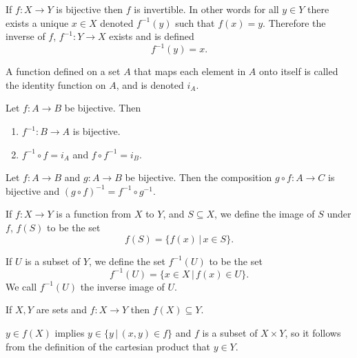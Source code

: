 \documentclass{article}
\begin{document}
\begin{lemma}
	If \(f:X\rightarrow Y\) is bijective then \(f\) is invertible. In other words for all \(y\in Y\) there exists a unique \(x\in X\) denoted \(f^{-1}(y)\) such that \(f(x)=y\). Therefore the inverse of \(f\), \(f^{-1}:Y\rightarrow X\) exists and is defined
	\begin{equation*}
		f^{-1}(y)=x.
	\end{equation*}
\end{lemma}
\begin{definition}
	A function defined on a set \(A\) that maps each element in \(A\) onto itself is called the identity function on \(A\), and is denoted \(i_A\).
\end{definition}
\begin{proposition}
	Let \(f:A\rightarrow B\) be bijective. Then
	\begin{enumerate}
		\item \(f^{-1}:B\rightarrow A\) is bijective.
		\item \(f^{-1}\circ f=i_A\) and \(f\circ f^{-1}=i_B\).
	\end{enumerate}
\end{proposition}
\begin{theorem}
	Let \(f:A\rightarrow B\) and \(g:A\rightarrow B\) be bijective. Then the composition \(g\circ f:A\rightarrow C\) is bijective and \((g\circ f)^{-1}=f^{-1}\circ g^{-1}\).
\end{theorem}
%
\begin{definition}[Image]
	If \(f:X\rightarrow Y\) is a function from \(X\) to \(Y\), and \(S\subseteq X\), we define the image of \(S\) under \(f\), \(f(S)\) to be the set
	\begin{equation*}
		f(S)=\{f(x)\,|\,x\in S\}.
	\end{equation*}
\end{definition}
\begin{definition}
	If \(U\) is a subset of \(Y\), we define the set \(f^{-1}(U)\) to be the set
	\begin{equation*}
		f^{-1}(U)=\{x\in X\,|\,f(x)\in U\}.
	\end{equation*}
	We call \(f^{-1}(U)\) the inverse image of \(U\).
\end{definition}
\begin{proposition}
	\label{imagessubset}
	If \(X,Y\) are sets and \(f:X\rightarrow Y\) then \(f(X)\subseteq Y\).
	\begin{IEEEproof}
		\(y\in f(X)\) implies \(y\in \{y\,|\,(x,y)\in f\}\) and \(f\) is a subset of \(X\times Y\), so it follows from the definition of the cartesian product that \(y\in Y\).
	\end{IEEEproof}
\end{proposition}
\end{document}
